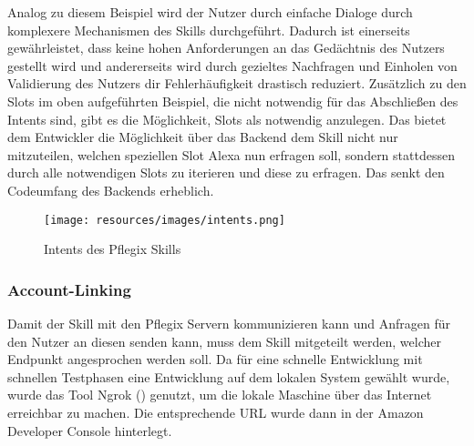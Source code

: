 Analog zu diesem Beispiel wird der Nutzer durch einfache Dialoge durch komplexere Mechanismen des Skills durchgeführt. Dadurch ist einerseits gewährleistet, dass keine hohen Anforderungen an das Gedächtnis des Nutzers gestellt wird und andererseits wird durch gezieltes Nachfragen und Einholen von Validierung des Nutzers dir Fehlerhäufigkeit drastisch reduziert. Zusätzlich zu den Slots im oben aufgeführten Beispiel, die nicht notwendig für das Abschließen des Intents sind, gibt es die Möglichkeit, Slots als notwendig anzulegen. Das bietet dem Entwickler die Möglichkeit über das Backend dem Skill nicht nur mitzuteilen, welchen speziellen Slot Alexa nun erfragen soll, sondern stattdessen durch alle notwendigen Slots zu iterieren und diese zu erfragen. Das senkt den Codeumfang des Backends erheblich.

\begin{figure} [H]
    \texttt{[image: resources/images/intents.png]}
    \caption{Intents des Pflegix Skills}
    \label{fig:intents}
\end{figure}

\subsubsection{Account-Linking}
Damit der Skill mit den Pflegix Servern kommunizieren kann und Anfragen für den Nutzer an diesen senden kann, muss dem Skill mitgeteilt werden, welcher Endpunkt angesprochen werden soll.
Da für eine schnelle Entwicklung mit schnellen Testphasen eine Entwicklung auf dem lokalen System gewählt wurde, wurde das Tool Ngrok (\citealp{Ngrok}) genutzt, um die lokale Maschine über das Internet erreichbar zu machen. Die entsprechende URL wurde dann in der Amazon Developer Console hinterlegt.

